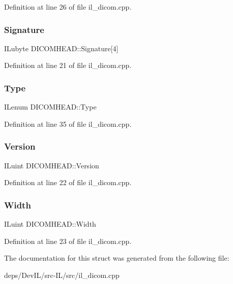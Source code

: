 Definition at line 26 of file il\+\_\+dicom.\+cpp.

\mbox{\label{structDICOMHEAD_a3a89a3c8488db2ed6387b484ed6fa9e0}} 
\subsubsection{\texorpdfstring{Signature}{Signature}}
{\footnotesize\ttfamily I\+Lubyte D\+I\+C\+O\+M\+H\+E\+A\+D\+::\+Signature\mbox{[}4\mbox{]}}



Definition at line 21 of file il\+\_\+dicom.\+cpp.

\mbox{\label{structDICOMHEAD_a38988bce90542ed865c64ab0647a0905}} 
\subsubsection{\texorpdfstring{Type}{Type}}
{\footnotesize\ttfamily I\+Lenum D\+I\+C\+O\+M\+H\+E\+A\+D\+::\+Type}



Definition at line 35 of file il\+\_\+dicom.\+cpp.

\mbox{\label{structDICOMHEAD_ad19f1d9236aea3e2da25825f2e90abc1}} 
\subsubsection{\texorpdfstring{Version}{Version}}
{\footnotesize\ttfamily I\+Luint D\+I\+C\+O\+M\+H\+E\+A\+D\+::\+Version}



Definition at line 22 of file il\+\_\+dicom.\+cpp.

\mbox{\label{structDICOMHEAD_aaf455fc35341ec228931d9d1134c4285}} 
\subsubsection{\texorpdfstring{Width}{Width}}
{\footnotesize\ttfamily I\+Luint D\+I\+C\+O\+M\+H\+E\+A\+D\+::\+Width}



Definition at line 23 of file il\+\_\+dicom.\+cpp.



The documentation for this struct was generated from the following file\+:\begin{DoxyCompactItemize}
\item 
deps/\+Dev\+I\+L/src-\/\+I\+L/src/il\+\_\+dicom.\+cpp\end{DoxyCompactItemize}
